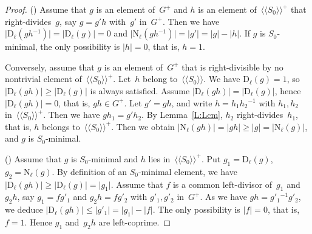 \documentclass{amsart}
\numberwithin{equation}{section}
\theoremstyle{plain}
\theoremstyle{definition}
\let\ge=\geqslant
\newcounter{ITEM}
\let\le=\leqslant
\begin{document}
\begin{proof}
{\setcounter{ITEM}{1}\leavevmode\hbox{\rm()}} Assume that ${g}$ is an element of~${G^{\scriptscriptstyle+}}$ and ${h}$ is an element of~${\langle\!\langle{{{S}_0}}\rangle\!\rangle^{\!\scriptscriptstyle+}}$ that right-divides~${g}$, say ${g} = {g}' {h}$ with~${g}'$ in~${G^{\scriptscriptstyle+}}$. Then we have ${\vert{{{\scriptstyle\mathrm{D}}{_{\ell}}({{g} {h}{^{-1}}})}}\vert} = {\vert{{{\scriptstyle\mathrm{D}}{_{\ell}}({g})}}\vert} = 0$ and ${\vert{{{\scriptstyle\mathrm{N}}{_{\ell}}({{g} {h}{^{-1}}})}}\vert} = {\vert{{g}'}\vert} = {\vert{g}\vert} - {\vert{h}\vert}$. If ${g}$ is ${S}_0$-minimal, the only possibility is ${\vert{h}\vert} = 0$, that is, ${h} = 1$. 

Conversely, assume that ${g}$ is an element of~${G^{\scriptscriptstyle+}}$ that is right-divisible by no nontrivial element of~${\langle\!\langle{{{S}_0}}\rangle\!\rangle^{\!\scriptscriptstyle+}}$. Let~${h}$ belong to~${\langle\!\langle{{{S}_0}}\rangle\!\rangle}$. We have ${{\scriptstyle\mathrm{D}}{_{\ell}}({g})} = 1$, so ${\vert{{{\scriptstyle\mathrm{D}}{_{\ell}}({{g} {h}})}}\vert} \ge {\vert{{{\scriptstyle\mathrm{D}}{_{\ell}}({g})}}\vert}$ is always satisfied. Assume ${\vert{{{\scriptstyle\mathrm{D}}{_{\ell}}({{g} {h}})}}\vert} = {\vert{{{\scriptstyle\mathrm{D}}{_{\ell}}({g})}}\vert}$, hence ${\vert{{{\scriptstyle\mathrm{D}}{_{\ell}}({{g} {h}})}}\vert} = 0$, that is, ${g} {h} \in {G^{\scriptscriptstyle+}}$. Let ${g}' = {g} {h}$, and write ${h} = {h}_1 {h}_2{^{-1}}$ with ${h}_1, {h}_2$ in~${\langle\!\langle{{{S}_0}}\rangle\!\rangle^{\!\scriptscriptstyle+}}$. Then we have ${g} {h}_1 = {g}' {h}_2$. By Lemma~\ref{L:Lcm}, ${h}_2$ right-divides~${h}_1$, that is, ${h}$ belongs to~${\langle\!\langle{{{S}_0}}\rangle\!\rangle^{\!\scriptscriptstyle+}}$. Then we obtain ${\vert{{{\scriptstyle\mathrm{N}}{_{\ell}}({{g} {h}})}}\vert} = {\vert{{g} {h}}\vert} \ge {\vert{g}\vert} = {\vert{{{\scriptstyle\mathrm{N}}{_{\ell}}({g})}}\vert}$, and ${g}$ is ${S}_0$-minimal.

{\setcounter{ITEM}{2}\leavevmode\hbox{\rm()}} Assume that ${g}$ is ${S}_0$-minimal and ${h}$ lies in~${\langle\!\langle{{{S}_0}}\rangle\!\rangle^{\!\scriptscriptstyle+}}$. Put ${g}_1 = {{\scriptstyle\mathrm{D}}{_{\ell}}({g})}$, ${g}_2 = {{\scriptstyle\mathrm{N}}{_{\ell}}({g})}$. By definition of an ${S}_0$-minimal element, we have ${\vert{{{\scriptstyle\mathrm{D}}{_{\ell}}({{g} {h}})}}\vert} \ge {\vert{{{\scriptstyle\mathrm{D}}{_{\ell}}({g})}}\vert} = {\vert{{g}_1}\vert}$. Assume that ${f}$ is a common left-divisor of~${g}_1$ and~${g}_2 {h}$, say ${g}_1 = {f} {g}'_1$ and ${g}_2 {h} = {f} {g}'_2$ with ${g}'_1, {g}'_2$ in~${G^{\scriptscriptstyle+}}$. As we have ${g} {h} = {g}'_1{}{^{-1}} {g}'_2$, we deduce ${\vert{{{\scriptstyle\mathrm{D}}{_{\ell}}({{g} {h}})}}\vert} \le {\vert{{g}'_1}\vert} = {\vert{{g}_1}\vert} - {\vert{f}\vert}$. The only possibility is ${\vert{f}\vert} = 0$, that is, ${f} = 1$. Hence ${g}_1$ and~${g}_2 {h}$ are left-coprime.


\end{proof}
\end{document}
